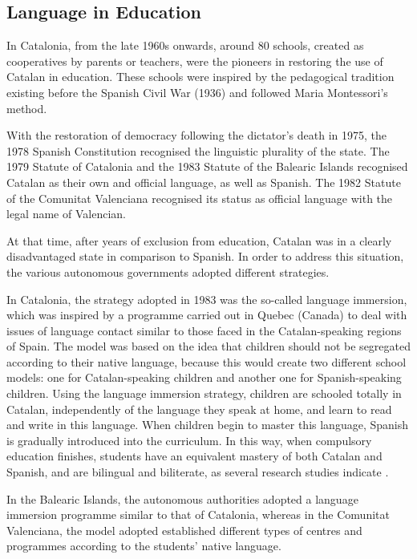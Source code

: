 \begin{multicols}{2}
\subsection{Language in Education}

In Catalonia, from the late 1960s onwards, around 80 schools, created as cooperatives by parents or teachers, were the pioneers in restoring the use of Catalan in education. These schools were inspired by the pedagogical tradition existing before the Spanish Civil War (1936) and followed Maria Montessori's method.

With the restoration of democracy following the dictator's death in 1975, the 1978 Spanish Constitution recognised the linguistic plurality of the state. The 1979 Statute of Catalonia and the 1983 Statute of the Balearic Islands recognised Catalan as their own and official language, as well as Spanish. The 1982 Statute of the Comunitat Valenciana recognised its status as official language with the legal name of Valencian.

At that time, after years of exclusion from education, Catalan was in a clearly disadvantaged state in comparison to Spanish. In order to address this situation, the various autonomous governments adopted different strategies.

In Catalonia, the strategy adopted in 1983 was the so-called language immersion, which was inspired by a programme carried out in Quebec (Canada) to deal with issues of language contact similar to those faced in the Catalan-speaking regions of Spain. The model was based on the idea that children should not be segregated according to their native language, because this would create two different school models: one for Catalan-speaking children and another one for Spanish-speaking children. Using the language immersion strategy, children are schooled totally in Catalan, independently of the language they speak at home, and learn to read and write in this language. When children begin to master this language, Spanish is gradually introduced into the curriculum. In this way, when compulsory education finishes, students have an equivalent mastery of both Catalan and Spanish, and are bilingual and biliterate, as several research studies indicate \cite{CAT-Nota5}.


In the Balearic Islands, the autonomous authorities adopted a language immersion programme similar to that of Catalonia, whereas in the Comunitat Valenciana, the model adopted established different types of centres and programmes according to the students' native language.


\end{multicols}
